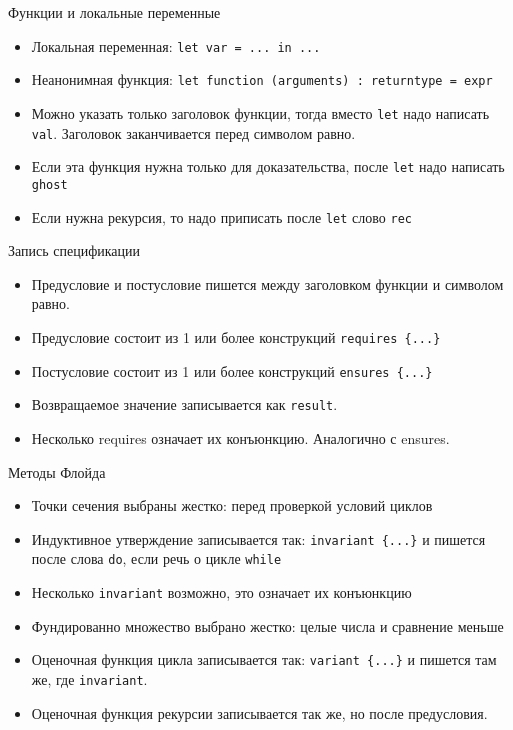 \documentclass[hyperref={unicode=true}]{beamer}
\begin{document}
    \begin{frame}{Функции и локальные переменные}
    \begin{itemize}
    \item
    Локальная переменная: \texttt{let var = ... in ... }
    \item
    Неанонимная функция:
    \texttt{let function (arguments) : returntype = expr}
    \item
    Можно указать только заголовок функции, тогда вместо \texttt{let}
    надо написать \texttt{val}. Заголовок заканчивается перед
    символом равно.
    \item
    Если эта функция нужна только для доказательства, после \texttt{let}
    надо написать \texttt{ghost}
    \item
    Если нужна рекурсия, то надо приписать после \texttt{let}
    слово \texttt{rec}
    \end{itemize}
    \end{frame}

    \begin{frame}{Запись спецификации}
    \begin{itemize}
    \item
    Предусловие и постусловие пишется
    между заголовком функции и символом равно.
    \item
    Предусловие состоит из 1 или более
    конструкций \texttt{requires \{...\} }
    \item
    Постусловие состоит из 1 или более
    конструкций \texttt{ensures \{...\} }
    \item
    Возвращаемое значение записывается как \texttt{result}.
    \item
    Несколько requires означает их конъюнкцию. Аналогично с ensures.
    \end{itemize}
    \end{frame}

    \begin{frame}{Методы Флойда}
    \begin{itemize}
    \item
    Точки сечения выбраны жестко: перед проверкой
    условий циклов
    \item
    Индуктивное утверждение записывается так: \texttt{invariant \{...\}}
    и пишется после слова \texttt{do}, если речь о цикле \texttt{while}
    \item
    Несколько \texttt{invariant} возможно, это означает их конъюнкцию
    \item
    Фундированно множество выбрано жестко: целые числа и сравнение меньше
    \item
    Оценочная функция цикла записывается так: \texttt{variant \{...\}}
    и пишется там же, где \texttt{invariant}.
    \item
    Оценочная функция рекурсии записывается так же, но после предусловия.
    \end{itemize}
    \end{frame}
\end{document}
